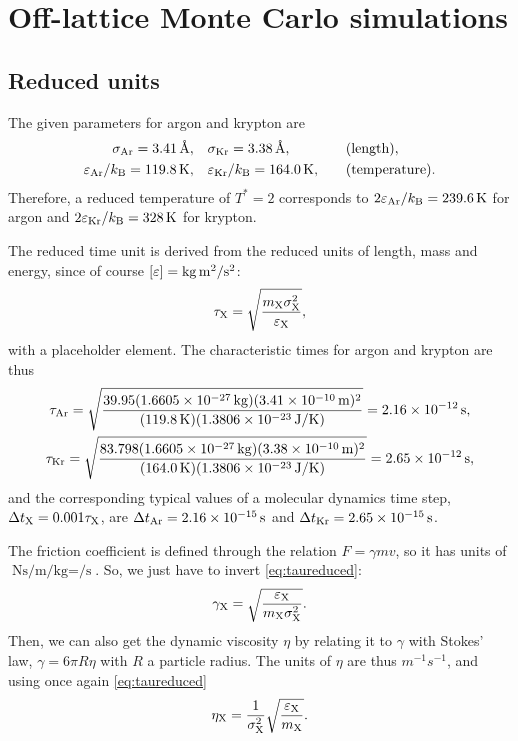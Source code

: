 \chapter{Off-lattice Monte Carlo simulations}\label{ch:offlat}

\section{Reduced units}

The given parameters for argon and krypton are
\begin{alignat}{2}
  \sigma_{\ce{Ar}} = \qty{3.41}{\angstrom}, \quad&
  \sigma_{\ce{Kr}} = \qty{3.38}{\angstrom}, &\quad& \text{(length)}, \\
  \epsilon_{\ce{Ar}} / k_{\mathrm{B}} = \qty{119.8}{K}, \quad&
  \epsilon_{\ce{Kr}} / k_{\mathrm{B}} = \qty{164.0}{K}, &\quad&
  \text{(temperature)}.
\end{alignat}
Therefore, a reduced temperature of $T^{*} = 2$ corresponds to
$2\epsilon_{\ce{Ar}} / k_{\mathrm{B}} = \qty{239.6}{K}$ for argon and $2
\epsilon_{\ce{Kr}} / k_{\mathrm{B}} = \qty{328}{K}$ for krypton.

The reduced time unit is derived from the reduced units of length, mass and
energy, since of course $[\epsilon] = \unit{kg.m\squared\per\second\squared}$:
\begin{equation}
  \tau_{\ce{X}} = \sqrt{\frac{m_{\ce{X}}
  \sigma_{\ce{X}}^{2}}{\epsilon_{\ce{X}}}},
  \label{eq:taureduced}
\end{equation}
with  a placeholder element. The characteristic times for argon and
krypton are thus
\begin{gather}
  \tau_{\ce{Ar}} = \sqrt{%
    \frac{\num{39.95} (\qty{1.6605e-27}{kg}) (\qty{3.41e-10}{m})^{2}}%
         {(\qty{119.8}{K}) (\qty{1.3806e-23}{J\per\kelvin})}
  } = \qty{2.16e-12}{s}, \\
  \tau_{\ce{Kr}} = \sqrt{%
    \frac{\num{83.798} (\qty{1.6605e-27}{kg}) (\qty{3.38e-10}{m})^{2}}%
         {(\qty{164.0}{K}) (\qty{1.3806e-23}{J\per\kelvin)}}
  } = \qty{2.65e-12}{s},
\end{gather}
and the corresponding typical values of a molecular dynamics time step, $\Delta
t_{\ce{X}} = \num{0.001} \tau_{\ce{X}}$, are $\Delta t_{\ce{Ar}} =
\qty{2.16e-15}{s}$ and $\Delta t_{\ce{Kr}} = \qty{2.65e-15}{s}$.

The friction coefficient is defined through the relation $F = \gamma m v$, so it
has units of $\unit{\newton\second\per\meter\per\kilogram} =
\unit{\per\second}$. So, we just have to invert \cref{eq:taureduced}:
\begin{equation}
  \gamma_{\ce{X}} = \sqrt{%
    \frac{\epsilon_{\ce{X}}}%
         {m_{\ce{X}}\sigma_{\ce{X}}^{2}}
  }.
\end{equation}
Then, we can also get the dynamic viscosity $\eta$ by relating it to $\gamma$
with Stokes' law, $\gamma = 6 \pi R \eta$ with $R$ a particle radius. The units
of $\eta$ are thus $\unit{m^{-1} s^{-1}}$, and using once again
\cref{eq:taureduced}
\begin{equation}
  \eta_{\ce{X}} = \frac{1}{\sigma_{\ce{X}}^{2}}
  \sqrt{\frac{\epsilon_{\ce{X}}}{m_{\ce{X}}}}.
\end{equation}

